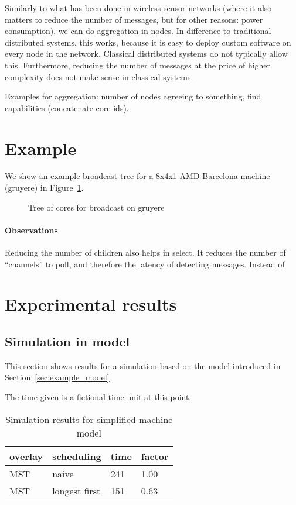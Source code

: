 \documentclass{article}
\begin{document}
Similarly to what has been done in wireless sensor networks (where it
also matters to reduce the number of messages, but for other reasons:
power consumption), we can do aggregation in nodes. In difference to
traditional distributed systems, this works, because it is easy to
deploy custom software on every node in the network. Classical
distributed systems do not typically allow this. Furthermore, reducing
the number of messages at the price of higher complexity does not make
sense in classical systems.

Examples for aggregation: number of nodes agreeing to something, find
capabilities (concatenate core ids). 

\section{Example}

We show an example broadcast tree for a 8x4x1 AMD Barcelona machine
(gruyere) in Figure~\ref{fig:qrm_tree_gruyere}.

\begin{figure}
  
  \caption{Tree of cores for broadcast on gruyere}
  \label{fig:qrm_tree_gruyere}
\end{figure}

\paragraph{Observations} Reducing the number of children also helps in
select. It reduces the number of ``channels'' to poll, and therefore
the latency of detecting messages. Instead of

\section{Experimental results}

\subsection{Simulation in model}

This section shows results for a simulation based on the model
introduced in Section~\ref{sec:example_model}

The time given is a fictional time unit at this point.

\begin{table}[htb]
  \centering
  \begin{tabular}{llll}
    \toprule
    overlay & scheduling & time & factor \\
    \midrule
    MST & naive         & 241 & 1.00 \\
    MST & longest first & 151 & 0.63 \\
    \bottomrule
  \end{tabular}
  \caption{Simulation results for simplified machine model}
  \label{tab:sim_results}
\end{table}
\end{document}
